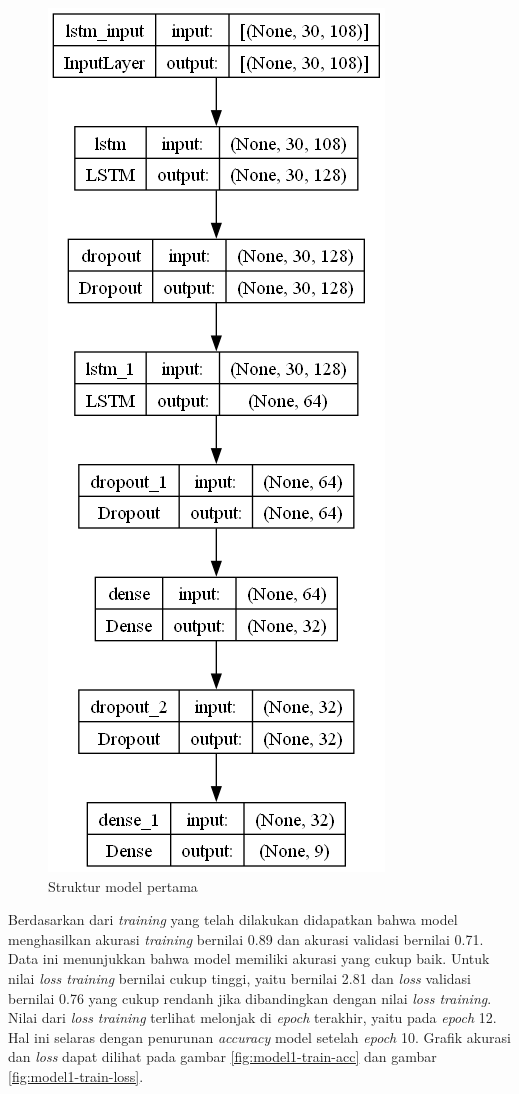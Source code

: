 \begin{figure}[H]
  \centering

  \includegraphics[scale=0.5]{gambar/bab4-uji-model-worst-model.png}

  \caption{Struktur model pertama}
  \label{fig:model1-struktur}
\end{figure}

Berdasarkan dari \emph{training} yang telah dilakukan didapatkan bahwa model menghasilkan akurasi \emph{training} bernilai 0.89 dan akurasi validasi bernilai 0.71. Data ini menunjukkan bahwa model memiliki akurasi yang cukup baik. Untuk nilai \emph{loss training} bernilai cukup tinggi, yaitu bernilai 2.81 dan \emph{loss} validasi bernilai 0.76 yang cukup rendanh jika dibandingkan dengan nilai \emph{loss training}. Nilai dari \emph{loss training} terlihat melonjak di \emph{epoch} terakhir, yaitu pada \emph{epoch} 12. Hal ini selaras dengan penurunan \emph{accuracy} model setelah \emph{epoch} 10. Grafik akurasi dan \emph{loss} dapat dilihat pada gambar \ref{fig:model1-train-acc} dan gambar \ref{fig:model1-train-loss}.

